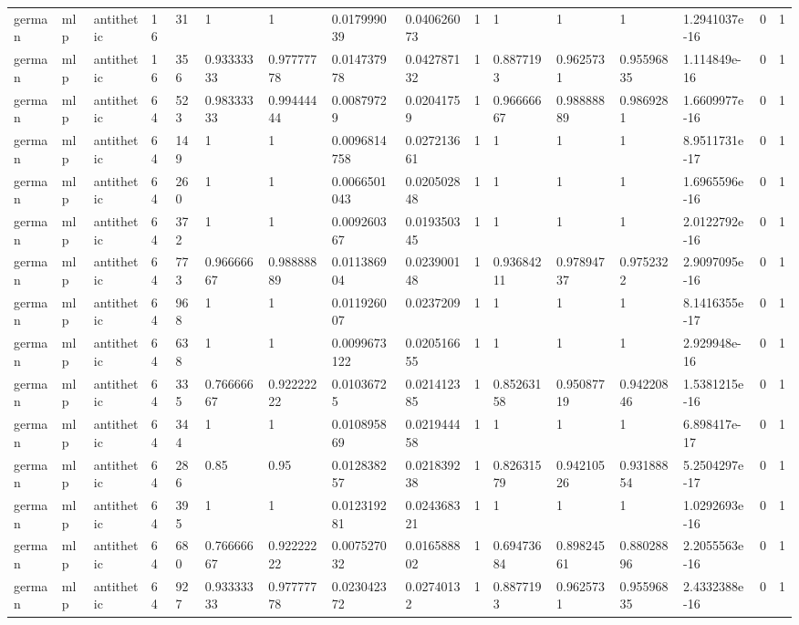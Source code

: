 \begin{tabular}{llllllllllllllll}
german & mlp & antithetic & 16 & 31 & 1 & 1 & 0.017999039 & 0.040626073 & 1 & 1 & 1 & 1 & 1.2941037e-16 & 0 & 1 \\
german & mlp & antithetic & 16 & 356 & 0.93333333 & 0.97777778 & 0.014737978 & 0.042787132 & 1 & 0.8877193 & 0.9625731 & 0.95596835 & 1.114849e-16 & 0 & 1 \\
german & mlp & antithetic & 64 & 523 & 0.98333333 & 0.99444444 & 0.00879729 & 0.02041759 & 1 & 0.96666667 & 0.98888889 & 0.9869281 & 1.6609977e-16 & 0 & 1 \\
german & mlp & antithetic & 64 & 149 & 1 & 1 & 0.0096814758 & 0.027213661 & 1 & 1 & 1 & 1 & 8.9511731e-17 & 0 & 1 \\
german & mlp & antithetic & 64 & 260 & 1 & 1 & 0.0066501043 & 0.020502848 & 1 & 1 & 1 & 1 & 1.6965596e-16 & 0 & 1 \\
german & mlp & antithetic & 64 & 372 & 1 & 1 & 0.009260367 & 0.019350345 & 1 & 1 & 1 & 1 & 2.0122792e-16 & 0 & 1 \\
german & mlp & antithetic & 64 & 773 & 0.96666667 & 0.98888889 & 0.011386904 & 0.023900148 & 1 & 0.93684211 & 0.97894737 & 0.9752322 & 2.9097095e-16 & 0 & 1 \\
german & mlp & antithetic & 64 & 968 & 1 & 1 & 0.011926007 & 0.0237209 & 1 & 1 & 1 & 1 & 8.1416355e-17 & 0 & 1 \\
german & mlp & antithetic & 64 & 638 & 1 & 1 & 0.0099673122 & 0.020516655 & 1 & 1 & 1 & 1 & 2.929948e-16 & 0 & 1 \\
german & mlp & antithetic & 64 & 335 & 0.76666667 & 0.92222222 & 0.01036725 & 0.021412385 & 1 & 0.85263158 & 0.95087719 & 0.94220846 & 1.5381215e-16 & 0 & 1 \\
german & mlp & antithetic & 64 & 344 & 1 & 1 & 0.010895869 & 0.021944458 & 1 & 1 & 1 & 1 & 6.898417e-17 & 0 & 1 \\
german & mlp & antithetic & 64 & 286 & 0.85 & 0.95 & 0.012838257 & 0.021839238 & 1 & 0.82631579 & 0.94210526 & 0.93188854 & 5.2504297e-17 & 0 & 1 \\
german & mlp & antithetic & 64 & 395 & 1 & 1 & 0.012319281 & 0.024368321 & 1 & 1 & 1 & 1 & 1.0292693e-16 & 0 & 1 \\
german & mlp & antithetic & 64 & 680 & 0.76666667 & 0.92222222 & 0.007527032 & 0.016588802 & 1 & 0.69473684 & 0.89824561 & 0.88028896 & 2.2055563e-16 & 0 & 1 \\
german & mlp & antithetic & 64 & 927 & 0.93333333 & 0.97777778 & 0.023042372 & 0.02740132 & 1 & 0.8877193 & 0.9625731 & 0.95596835 & 2.4332388e-16 & 0 & 1 \\

\end{tabular}
